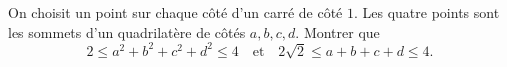 On choisit un point sur chaque côté d'un carré de côté $1$. Les quatre points sont les sommets d'un quadrilatère de côtés $a, b, c, d$. Montrer que
\[ 2 \leq a^2 + b^2 + c^2 + d^2 \leq 4 \quad\text{et}\quad 2\sqrt{2} \leq a + b + c + d \leq 4. \]

